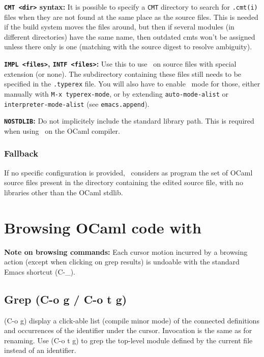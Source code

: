 {\bf \verb!CMT <dir>! syntax:} It is possible to specify a \verb!CMT!
directory to search for \verb!.cmt(i)! files when they are not found
at the same place as the source files. This is needed if the build
system moves the files around, but then if several modules (in
different directories) have the same name, then outdated cmts won't be
assigned unless there only is one (matching with the source digest to
resolve ambiguity).

{\bf \verb!IMPL <files>!, \verb!INTF <files>!:} Use this to use
\typerex\ on source files with special extension (or none). The
subdirectory containing these files still needs to be specified in the
\verb!.typerex! file. You will also have to enable \typerex\ mode for
those, either manually with \verb!M-x typerex-mode!, or by extending
\verb!auto-mode-alist!  or \verb!interpreter-mode-alist! (see
\verb!emacs.append!).

{\bf \verb!NOSTDLIB!:} Do not implicitely include the standard library
path.  This is required when using \typerex\ on the OCaml compiler.



\subsubsection{Fallback}

If no specific configuration is provided, \typerex\ considers as
program the set of OCaml source files present in the directory
containing the edited source file, with no libraries other than the
OCaml stdlib.

\section{Browsing OCaml code with \typerex}

{\bf Note on browsing commands:} Each cursor motion incurred by a
browsing action (except when clicking on grep results) is undoable
with the standard Emacs shortcut (C-\_).

\subsection{Grep (C-o g / C-o t g)}
(C-o g) display a click-able list (compile minor mode) of the connected
definitions and occurrences of the identifier under the cursor. Invocation
is the same as for renaming. Use (C-o t g) to grep the top-level module
defined by the current file instead of an identifier.

